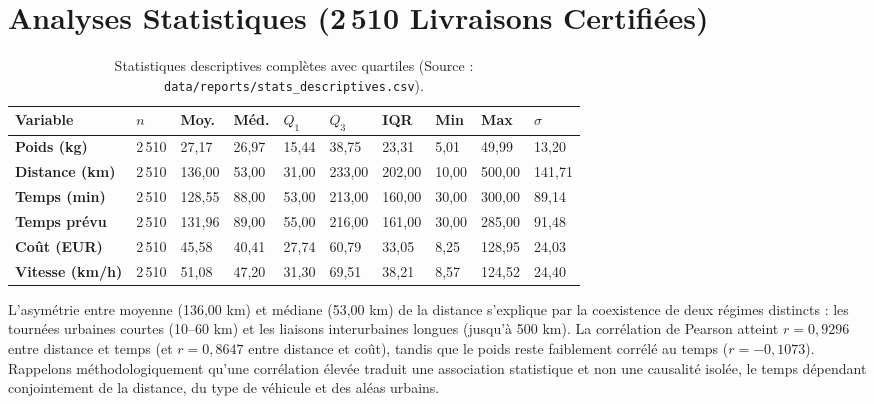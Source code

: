 \documentclass[11pt,a4paper]{article}
\begin{document}
\section{Analyses Statistiques (2\,510 Livraisons Certifi\'ees)}

\begin{table}[H]
\centering
\scriptsize
\begin{tabularx}{\textwidth}{@{}>{\bfseries}p{2.5cm} Y Y Y Y Y Y Y Y Y@{}}
\toprule
{} Variable & $n$ & Moy. & M\'ed. & $Q_1$ & $Q_3$ & IQR & Min & Max & $\sigma$ \\
\midrule
Poids (kg) & 2\,510 & 27,17 & 26,97 & 15,44 & 38,75 & 23,31 & 5,01 & 49,99 & 13,20 \\
 Distance (km) & 2\,510 & 136,00 & 53,00 & 31,00 & 233,00 & 202,00 & 10,00 & 500,00 & 141,71 \\
Temps (min) & 2\,510 & 128,55 & 88,00 & 53,00 & 213,00 & 160,00 & 30,00 & 300,00 & 89,14 \\
 Temps pr\'evu & 2\,510 & 131,96 & 89,00 & 55,00 & 216,00 & 161,00 & 30,00 & 285,00 & 91,48 \\
Co\^ut (EUR) & 2\,510 & 45,58 & 40,41 & 27,74 & 60,79 & 33,05 & 8,25 & 128,95 & 24,03 \\
 Vitesse (km/h) & 2\,510 & 51,08 & 47,20 & 31,30 & 69,51 & 38,21 & 8,57 & 124,52 & 24,40 \\
\bottomrule
\end{tabularx}
\caption{Statistiques descriptives compl\`etes avec quartiles (Source : \texttt{data/reports/stats\_descriptives.csv}).}
\end{table}

L'asym\'etrie entre moyenne (136,00 km) et m\'ediane (53,00 km) de la distance s'explique par la coexistence de deux r\'egimes distincts : les tourn\'ees urbaines courtes (10--60 km) et les liaisons interurbaines longues (jusqu'\`a 500 km). La corr\'elation de Pearson atteint $r = 0,9296$ entre distance et temps (et $r = 0,8647$ entre distance et co\^ut), tandis que le poids reste faiblement corr\'el\'e au temps ($r = -0,1073$). Rappelons m\'ethodologiquement qu'une corr\'elation \'elev\'ee traduit une association statistique et non une causalit\'e isol\'ee, le temps d\'ependant conjointement de la distance, du type de v\'ehicule et des al\'eas urbains.

\end{document}
